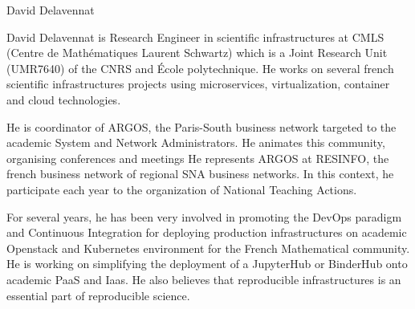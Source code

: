 \begin{participant}[type=R,PM=4,gender=male]{David Delavennat}

    David Delavennat is Research Engineer in scientific infrastructures at CMLS
    (Centre de Mathématiques Laurent Schwartz) which is a Joint Research Unit
    (UMR7640) of the CNRS and \'Ecole polytechnique. He
    works on several french scientific infrastructures projects using
    microservices, virtualization, container and cloud technologies.

    He is coordinator of ARGOS, the Paris-South business network targeted to the
    academic System and Network Administrators. He animates this community,
    organising conferences and meetings He represents ARGOS at RESINFO, the
    french business network of regional SNA business networks. In this context,
    he participate each year to the organization of National Teaching Actions.

    For several years, he has been very involved in promoting the DevOps
    paradigm and Continuous Integration for deploying production infrastructures
    on academic Openstack and Kubernetes environment for the French Mathematical
    community. He is working on simplifying the deployment of a JupyterHub or
    BinderHub onto academic PaaS and Iaas. He also believes that reproducible
    infrastructures is an essential part of reproducible science.

\end{participant}